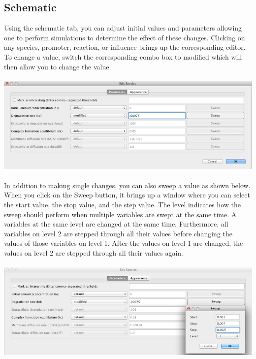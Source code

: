 \documentclass[titlepage,11pt]{article}
\begin{document}
\subsection{\label{AnalysisSchematic}Schematic}

Using the schematic tab, you can adjust initial values and parameters allowing one to perform simulations to determine the effect of these changes.  Clicking on any species, promoter, reaction, or influence brings up the corresponding editor.  To change a value, switch the corresponding combo box to modified which will then allow you to change the value.  

\begin{center}
\includegraphics[height=50mm]{screenshots/paramEdit}
\end{center}

In addition to making single changes, you can also sweep a value as shown below.   When you click on the Sweep button, it brings up a window where you can select the start value, the stop value, and the step value.  The level indicates how the sweep should perform when multiple variables are swept at the same time.  A variables at the same level are changed at the same time.  Furthermore, all variables on level 2 are stepped through all their values before changing the values of those variables on level 1.  After the values on level 1 are changed, the values on level 2 are stepped through all their values again.  

\begin{center}
\includegraphics[height=50mm]{screenshots/sweep}
\end{center}
\end{document}
